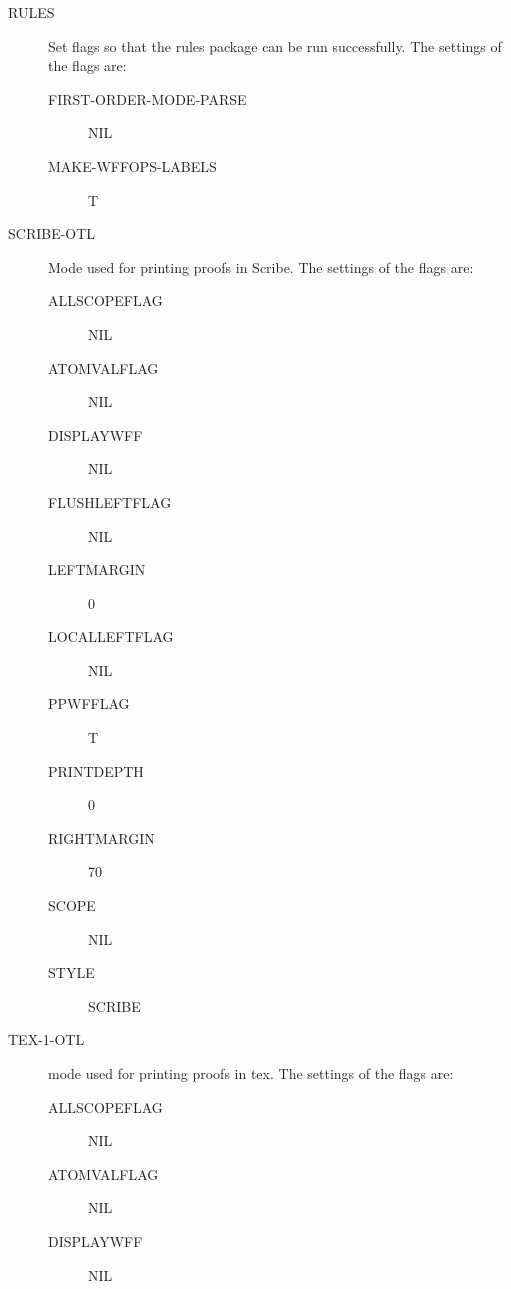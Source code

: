 \begin{description} 
\item[RULES]  
Set flags so that the rules package can be run successfully. The settings of the flags are:
\begin{description}
\item[FIRST-ORDER-MODE-PARSE] NIL

\item[MAKE-WFFOPS-LABELS] T

\end{description}

\item[SCRIBE-OTL]  
Mode used for printing proofs in Scribe. The settings of the flags are:
\begin{description}
\item[ALLSCOPEFLAG] NIL

\item[ATOMVALFLAG] NIL

\item[DISPLAYWFF] NIL

\item[FLUSHLEFTFLAG] NIL

\item[LEFTMARGIN] 0

\item[LOCALLEFTFLAG] NIL

\item[PPWFFLAG] T

\item[PRINTDEPTH] 0

\item[RIGHTMARGIN] 70

\item[SCOPE] NIL

\item[STYLE] SCRIBE

\end{description}

\item[TEX-1-OTL]  
mode used for printing proofs in tex. The settings of the flags are:
\begin{description}
\item[ALLSCOPEFLAG] NIL

\item[ATOMVALFLAG] NIL

\item[DISPLAYWFF] NIL


\end{description}
\end{description}
